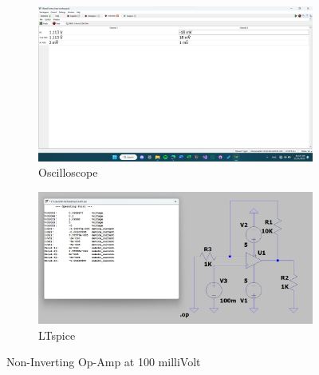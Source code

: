 \documentclass{zc-ust-hw}
\begin{document}
\begin{figure}[htpb]
  \centering
  \begin{subfigure}[b]{0.45\textwidth}
    \includegraphics[width=\textwidth]{figures/non-inv-opamp-100mv.png}
    \caption{Oscilloscope}
  \end{subfigure}
  \hfill
  \begin{subfigure}[b]{0.45\textwidth}
    \includegraphics[width=\textwidth]{figures/non-inv-opamp-100mv-lts.png}
    \caption{LTspice}
  \end{subfigure}
  \caption{Non-Inverting Op-Amp at 100 milliVolt}
\end{figure}
\end{document}
